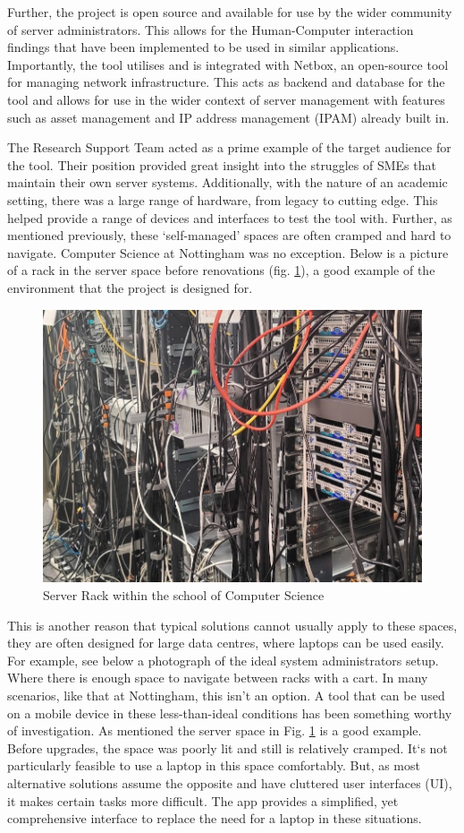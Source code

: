 \documentclass [11pt,a4paper]{article}
\begin{document}
Further, the project is open source and available for use by the wider community of server administrators. This  allows for the Human-Computer interaction findings that have been implemented to be used in similar applications. Importantly, the tool utilises and is integrated with Netbox\cite{Netbox}, an open-source tool for managing network infrastructure. This acts as backend and database for the tool and allows for use in the wider context of server management with features such as asset management and IP address management (IPAM) already built in.

The Research Support Team acted as a prime example of the target audience for the tool. Their position provided great insight into the struggles of SMEs that maintain their own server systems. Additionally, with the nature of an academic setting, there was a large range of hardware, from legacy to cutting edge. This helped provide a range of devices and interfaces to test the tool with. Further, as mentioned previously, these `self-managed' spaces are often cramped and hard to navigate. Computer Science at Nottingham was no exception. Below is a picture of a rack in the server space before renovations (fig. \ref{fig:server_rack}), a good example of the environment that the project is designed for.

\begin{figure}[H]
    \centering
    \includegraphics[width=0.40\linewidth]{images/server_racks.jpg}
    \caption{Server Rack within the school of Computer Science}
    \label{fig:server_rack}
\end{figure}

This is another reason that typical solutions cannot usually apply to these spaces, they are often designed for large data centres, where laptops can be used easily. For example, see below a photograph of the ideal system administrators setup. Where there is enough space to navigate between racks with a cart. In many scenarios, like that at Nottingham, this isn't an option. A tool that can be used on a mobile device in these less-than-ideal conditions has been something worthy of investigation. As mentioned the server space in Fig. \ref{fig:server_rack} is a good example. Before upgrades, the space was poorly lit and still is relatively cramped. It`s not particularly feasible to use a laptop in this space comfortably. But, as most alternative solutions assume the opposite and have cluttered user interfaces (UI), it makes certain tasks more difficult. The app provides a simplified, yet comprehensive interface to replace the need for a laptop in these situations.
\end{document}
